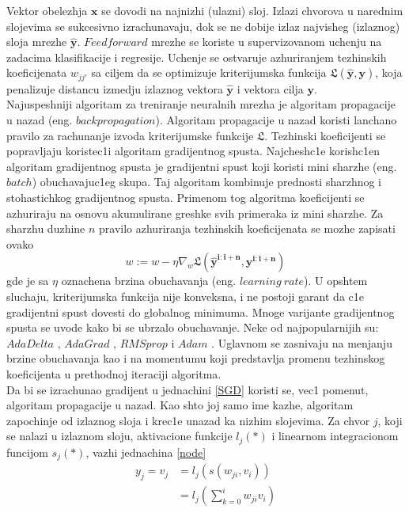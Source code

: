 \documentclass[a4paper, openany, oneside, 11pt]{book}
\begin{document}
Vektor obelezhja $\mathbf{x}$ se dovodi na najnizhi (ulazni) sloj. Izlazi chvorova u narednim slojevima se sukcesivno izrachunavaju, dok se ne dobije izlaz najvisheg (izlaznog) sloja mrezhe $\mathbf{\hat{y}}$. $Feedforward$ mrezhe se koriste u supervizovanom uchenju na zadacima klasifikacije i regresije. Uchenje se ostvaruje azhuriranjem tezhinskih koeficijenata $w_{jj'}$ sa ciljem da se optimizuje kriterijumska funkcija $\mathfrak{L}(\mathbf{\hat{y}}, \mathbf{y})$, koja penalizuje distancu izmedju izlaznog vektora $\mathbf{\hat{y}}$ i vektora cilja $\mathbf{y}$.\\
Najuspeshniji algoritam za treniranje neuralnih mrezha je algoritam propagacije u nazad (eng. $backpropagation$)\cite{Backprog}. Algoritam propagacije u nazad koristi lanchano pravilo za rachunanje izvoda kriterijumske funkcije $\mathfrak{L}$. Tezhinski koeficijenti se popravljaju koristec1i algoritam gradijentnog spusta. Najchesh\-c1e korish\-c1en algoritam gradijentnog spusta je gradijentni spust koji koristi mini sharzhe (eng. $batch$) obuchavajuc1eg skupa. Taj algoritam kombinuje prednosti sharzhnog i stohastichkog gradijentnog spusta. Primenom tog algoritma koeficijenti se azhuriraju na osnovu akumulirane greshke svih primeraka iz mini sharzhe. Za sharzhu duzhine $n$ pravilo azhuriranja tezhinskih koeficijenata se mozhe zapisati ovako
\begin{equation}\label{SGD}
w := w- \eta\nabla_w\mathfrak{L}\left(\mathbf{\hat{y}^{i:i+n}}, \mathbf{y^{i:i+n}}\right)
\end{equation}
gde je sa $\eta$ oznachena brzina obuchavanja (eng. $learning\ rate$).
U opshtem sluchaju, kriterijumska funkcija nije konveksna, i ne postoji garant da c1e gradijentni spust dovesti do globalnog minimuma. Mnoge varijante gradijentnog spusta se uvode kako bi se ubrzalo obuchavanje. Neke od najpopularnijih su: $AdaDelta$ \cite{AdaDelta}, $AdaGrad$ \cite{AdaGrad}, $RMSprop$ \cite{RMSprop} i $Adam$ \cite{Adam}. Uglavnom se zasnivaju na menjanju brzine obu\-chavanja kao i na momentumu koji predstavlja promenu tezhinskog koeficijenta u prethodnoj iteraciji algoritma.\\
Da bi se izrachunao gradijent u jednachini \ref{SGD} koristi se, vec1 pomenut, algoritam propagacije u nazad. Kao shto joj samo ime kazhe, algoritam zapochinje od izlaznog sloja i krec1e unazad ka nizhim slojevima. 
Za chvor $j$, koji se nalazi u izlaznom sloju, aktivacione funkcije $l_j(*)$ i linearnom integracionom funcijom $s_j(*)$, vazhi jednachina \ref{node}
\begin{align}
y_j=v_j &= l_j\left(s(w_{ji},v_i)\right)\\
&=l_j\left(\sum^{i}_{k=0}w_{ji}v_i\right)
\end{align}
\end{document}
